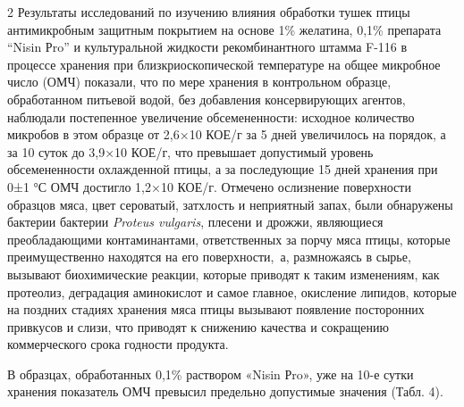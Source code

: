 \begin{multicols}{2}
Результаты исследований по изучению влияния обработки тушек птицы
антимикробным защитным покрытием на основе 1\% желатина, 0,1\% препарата
``Nisin Рro'' и культуральной жидкости рекомбинантного штамма F-116 в
процессе хранения при близкриоскопической температуре на общее микробное
число (ОМЧ) показали, что по мере хранения в контрольном образце,
обработанном питьевой водой, без добавления консервирующих агентов,
наблюдали постепенное увеличение обсемененности: исходное количество
микробов в этом образце от 2,6×10 КОЕ/г за 5 дней
увеличилось на порядок, а за 10 суток до 3,9×10
КОЕ/г, что превышает допустимый уровень обсемененности охлажденной
птицы, а за последующие 15 дней хранения при 0±1 °С ОМЧ достигло
1,2×10 КОЕ/г. Отмечено ослизнение поверхности
образцов мяса, цвет сероватый, затхлость и неприятный запах, были
обнаружены бактерии бактерии \emph{Proteus vulgaris}, плесени и дрожжи,
являющиеся преобладающими контаминантами, ответственных за порчу мяса
птицы, которые преимущественно находятся на его поверхности,~а,
размножаясь в сырье, вызывают биохимические реакции, которые приводят к
таким изменениям, как протеолиз, деградация аминокислот и самое главное,
окисление липидов, которые на поздних стадиях хранения мяса птицы
вызывают появление посторонних привкусов и слизи, что приводят к
снижению качества и сокращению коммерческого срока годности продукта.

В образцах, обработанных 0,1\% раствором «Nisin Рro», уже на 10-е сутки
хранения показатель ОМЧ превысил предельно допустимые значения (Табл.
4).
\end{multicols}

